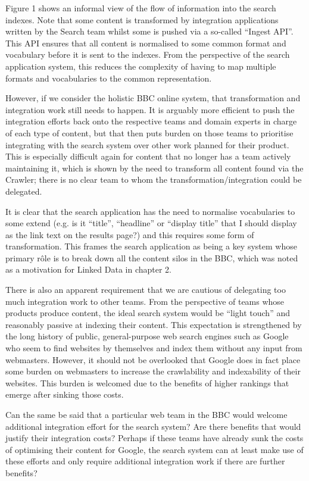 Figure 1 shows an informal view of the flow of information into the
search indexes. Note that some content is transformed
by integration applications written by the Search team whilst some
is pushed via a so-called ``Ingest API''. This API ensures that
all content is normalised to some common format and vocabulary before
it is sent to the indexes. From the perspective of the search application
system, this reduces the complexity of having to map multiple formats
and vocabularies to the common representation.

However, if we consider the holistic BBC online system, that transformation
and integration work still needs to happen. It is arguably more efficient to
push the integration efforts back onto the respective teams and domain experts
in charge of each type of content, but that then puts burden on those teams
to prioritise integrating with the search system over other work planned
for their product. This is especially difficult again for content that no
longer has a team actively maintaining it, which is shown by the need
to transform all content found via the Crawler; there is no clear team to
whom the transformation/integration could be delegated.

It is clear that the search application has the need to normalise vocabularies
to some extend (e.g. is it ``title'', ``headline'' or ``display title''
that I should display as the link text on the results page?) and this requires
some form of transformation. This frames the search application as being a
key system whose primary r\^ole is to break down all the content silos in the
BBC, which was noted as a motivation for Linked Data in chapter 2.

There is also an apparent requirement that we are cautious of delegating
too much integration work to other teams. From the perspective of teams
whose products produce content, the ideal search system would be
``light touch'' and reasonably passive at indexing their content. This
expectation is strengthened by the long history of public, general-purpose
web search engines such as Google who seem to find websites by themselves
and index them without any input from webmasters. However, it should
not be overlooked that Google does in fact place some burden on webmasters
to increase the crawlability and indexability of their websites. This
burden is welcomed due to the benefits of higher rankings that emerge
after sinking those costs.

Can the same be said that a particular web team
in the BBC would welcome additional integration effort for the search system?
Are there benefits that would justify their integration costs? Perhaps if
these teams have already sunk the costs of optimising their content for
Google, the search system can at least make use of these efforts and only
require additional integration work if there are further benefits?

